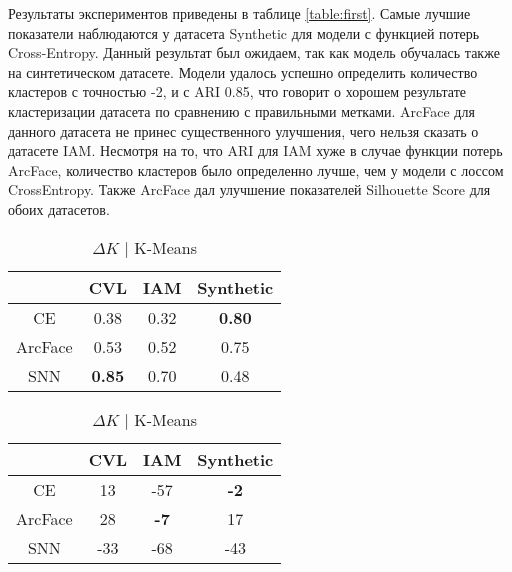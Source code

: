 Результаты экспериментов приведены в таблице \ref{table:first}. Самые лучшие показатели наблюдаются у датасета Synthetic для модели с функцией потерь Cross-Entropy. Данный результат был ожидаем, так как модель обучалась также на синтетическом датасете. Модели удалось успешно определить количество кластеров с точностью -2, и с ARI 0.85, что говорит о хорошем результате кластеризации датасета по сравнению с правильными метками. ArcFace для данного датасета не принес существенного улучшения, чего нельзя сказать о датасете IAM. Несмотря на то, что ARI для IAM хуже в случае функции потерь ArcFace, количество кластеров было определенно лучше, чем у модели с лоссом CrossEntropy. Также ArcFace дал улучшение показателей Silhouette Score для обоих датасетов.

\begin{table}[ht]
    \centering
    \captionsetup{width=0.9\textwidth}

    \hspace*{-4em}\scalebox{0.75} {
        \begin{subtable}{0.4\linewidth}
            \centering
            \caption{Silhouette Score | K-Means}
            \begin{tabular}{|c|c|c|c|}
            \hline
                & CVL & IAM & Synthetic \\
            \hline
            CE & 0.38 & 0.32 & \textbf{0.80} \\
            ArcFace & 0.53 & 0.52 & 0.75 \\
            SNN & \textbf{0.85} & 0.70 & 0.48 \\
            \hline
            \end{tabular}
        \end{subtable}

        \hfill
        \begin{subtable}{0.4\linewidth}
            \centering
            \caption{$\Delta K$ | K-Means}
            \begin{tabular}{|c|c|c|c|}
            \hline
                & CVL & IAM & Synthetic \\
            \hline
            CE & 13 & -57 & \textbf{-2} \\
            ArcFace & 28 & \textbf{-7} & 17 \\
            SNN & -33 & -68 & -43 \\
            \hline
            \end{tabular}
        \end{subtable}
        
}
\end{table}
